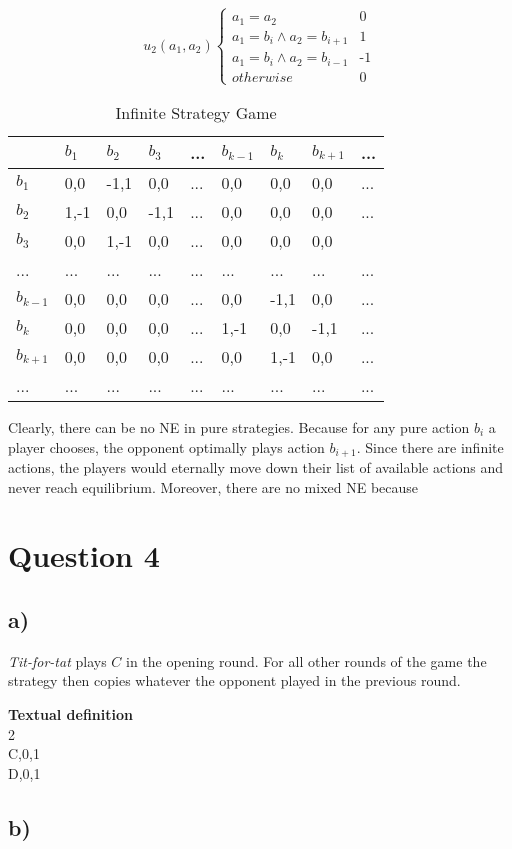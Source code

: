 \documentclass[10pt,a4paper]{article}
\begin{document}
\begin{equation*}
u_2(a_1,a_2) \begin{cases}
a_1=a_2 & \text{0}\\
a_1=b_i \land a_2=b_{i+1} & \text{1}\\
a_1=b_i \land a_2=b_{i-1} & \text{-1}\\
otherwise & \text{0}
\end{cases}
\end{equation*}

\begin{table}[h]
\centering
\caption{Infinite Strategy Game}
\begin{tabular}{|l|l|l|l|l|l|l|l|l|}
\hline
          & $b_1$ & $b_2$ & $b_3$ & ... & $b_{k-1}$ & $b_{k}$ & $b_{k+1}$ & ... \\ \hline
$b_1$     & 0,0   & -1,1  & 0,0   & ... & 0,0       & 0,0     & 0,0       & ... \\ \hline
$b_2$     & 1,-1  & 0,0   & -1,1  & ... & 0,0       & 0,0     & 0,0       & ... \\ \hline
$b_3$     & 0,0   & 1,-1  & 0,0   & ... & 0,0       & 0,0     & 0,0       &     \\ \hline
...       & ...   & ...   & ...   & ... & ...       & ...     & ...       & ... \\ \hline
$b_{k-1}$ & 0,0   & 0,0   & 0,0   & ... & 0,0       & -1,1    & 0,0       & ... \\ \hline
$b_{k}$   & 0,0   & 0,0   & 0,0   & ... & 1,-1      & 0,0     & -1,1      & ... \\ \hline
$b_{k+1}$ & 0,0   & 0,0   & 0,0   & ... & 0,0       & 1,-1    & 0,0       & ... \\ \hline
...       & ...   & ...   & ...   & ... & ...       & ...     & ...       & ... \\ \hline
\end{tabular}
\end{table}

Clearly, there can be no NE in pure strategies. Because for any pure action $b_i$ a player chooses, the opponent optimally plays action $b_{i+1}$. Since there are infinite actions, the players would eternally move down their list of available actions and never reach equilibrium. Moreover, there are no mixed NE because

\section*{Question 4}
\subsection*{a)}
\textit{Tit-for-tat} plays $C$ in the opening round. For all other rounds of the game the strategy then copies whatever the opponent played in the previous round.

\textbf{Textual definition}\\
2\\
C,0,1\\
D,0,1

\subsection*{b)}
\end{document}
